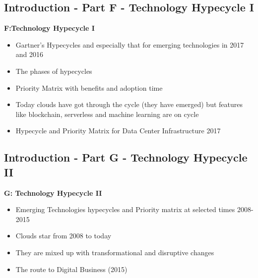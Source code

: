 \subsection{Introduction - Part F - Technology Hypecycle I}\label{s:cloud-fundamentals-f}


\textbf{F:Technology Hypecycle I}

\begin{itemize}
\item Gartner's Hypecycles and especially that for emerging
  technologies in 2017 and 2016
\item The phases of hypecycles
\item Priority Matrix with benefits and adoption time
\item Today clouds have got through the cycle (they have emerged) but
  features like blockchain, serverless and machine learning are on
  cycle
\item Hypecycle and Priority Matrix for Data Center Infrastructure
  2017

\end{itemize}

\subsection{Introduction - Part G - Technology Hypecycle II}\label{s:cloud-fundamentals-g}


\textbf{G: Technology Hypecycle II}

\begin{itemize}
\item Emerging Technologies hypecycles and Priority matrix at selected
  times 2008-2015
\item Clouds star from 2008 to today
\item They are mixed up with transformational and disruptive changes
\item The route to Digital Business (2015)
\end{itemize}

